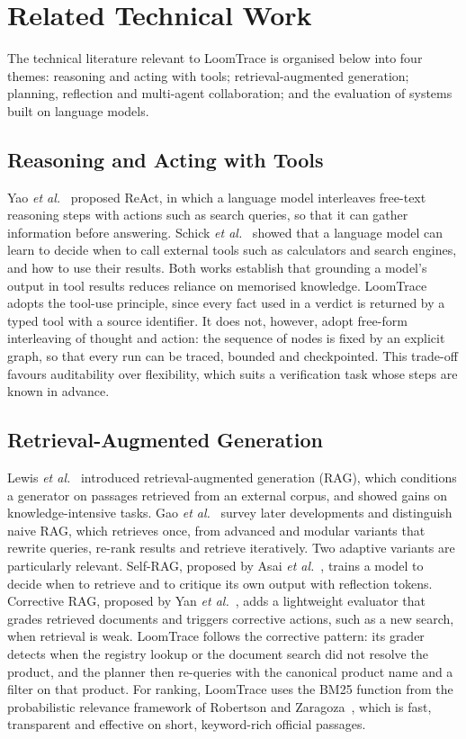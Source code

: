 \section{Related Technical Work}

The technical literature relevant to LoomTrace is organised below into four themes: reasoning and
acting with tools; retrieval-augmented generation; planning, reflection and multi-agent
collaboration; and the evaluation of systems built on language models.

\subsection{Reasoning and Acting with Tools}

Yao \emph{et al.}~\cite{yao2023react} proposed ReAct, in which a language model interleaves
free-text reasoning steps with actions such as search queries, so that it can gather information
before answering. Schick \emph{et al.}~\cite{schick2023toolformer} showed that a language model can
learn to decide when to call external tools such as calculators and search engines, and how to use
their results. Both works establish that grounding a model's output in tool results reduces reliance
on memorised knowledge. LoomTrace adopts the tool-use principle, since every fact used in a verdict is
returned by a typed tool with a source identifier. It does not, however, adopt free-form interleaving
of thought and action: the sequence of nodes is fixed by an explicit graph, so that every run can be
traced, bounded and checkpointed. This trade-off favours auditability over flexibility, which suits a
verification task whose steps are known in advance.

\subsection{Retrieval-Augmented Generation}

Lewis \emph{et al.}~\cite{lewis2020rag} introduced retrieval-augmented generation (RAG), which
conditions a generator on passages retrieved from an external corpus, and showed gains on
knowledge-intensive tasks. Gao \emph{et al.}~\cite{gao2023ragsurvey} survey later developments and
distinguish naive RAG, which retrieves once, from advanced and modular variants that rewrite queries,
re-rank results and retrieve iteratively. Two adaptive variants are particularly relevant. Self-RAG,
proposed by Asai \emph{et al.}~\cite{asai2024selfrag}, trains a model to decide when to retrieve and to
critique its own output with reflection tokens. Corrective RAG, proposed by Yan
\emph{et al.}~\cite{yan2024crag}, adds a lightweight evaluator that grades retrieved documents and
triggers corrective actions, such as a new search, when retrieval is weak. LoomTrace follows the
corrective pattern: its grader detects when the registry lookup or the document search did not
resolve the product, and the planner then re-queries with the canonical product name and a filter on
that product. For ranking, LoomTrace uses the BM25 function from the probabilistic relevance
framework of Robertson and Zaragoza~\cite{robertson2009bm25}, which is fast, transparent and effective
on short, keyword-rich official passages.

